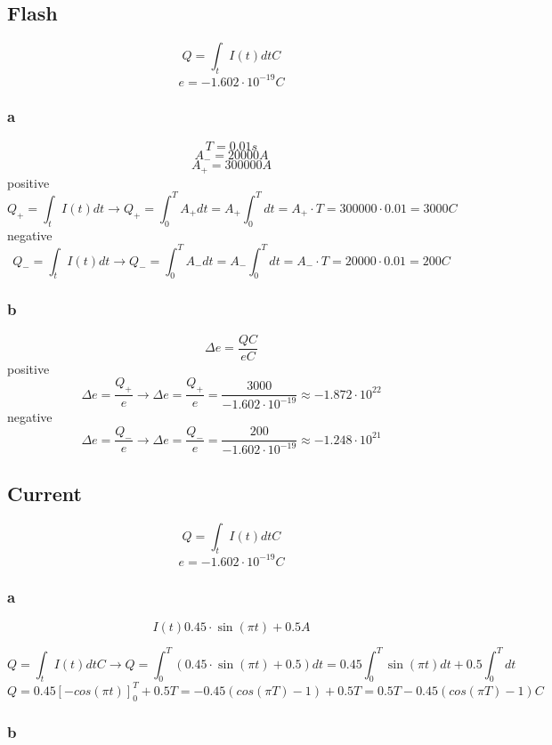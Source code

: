 \subsection{Flash}

\[Q = \int_t I(t) dt \unit{C}\]
\[e = - 1.602 \cdot 10^{-19} \unit{C}\]

\subsubsection{a}

\[T	=   0.01 \unit{s}\]
\[A_-	=  20000 \unit{A}\]
\[A_+	= 300000 \unit{A}\]
positive
\[
	Q_+ = \int_t I(t) dt
	\to Q_+ = \int_0^{T} A_+ dt
	= A_+ \int_0^{T} dt
	= A_+ \cdot T = 300000 \cdot 0.01 = 3000 \unit{C}
\]
negative
\[
	Q_- = \int_t I(t) dt
	\to Q_- = \int_0^{T} A_- dt
	= A_- \int_0^{T} dt
	= A_- \cdot T = 20000 \cdot 0.01 = 200 \unit{C}
\]

\subsubsection{b}
\[\Delta e = \frac{Q \unit{C}}{e \unit{C}}\]
positive
\[
	\Delta e = \frac{Q_+}{e}
	\to \Delta e = \frac{Q_+}{e}
	= \frac{3000}{- 1.602 \cdot 10^{-19}}
	\approx - 1.872 \cdot 10^{22}
\]
negative
\[
	\Delta e = \frac{Q_-}{e}
	\to \Delta e = \frac{Q_-}{e}
	= \frac{200}{- 1.602 \cdot 10^{-19}}
	\approx - 1.248 \cdot 10^{21}
\]

\subsection{Current}

\[Q = \int_t I(t) dt \unit{C}\]
\[e = - 1.602 \cdot 10^{-19} \unit{C}\]

\subsubsection{a}

\[I(t) 0.45 \cdot \sin(\pi t) + 0.5 \unit{A}\]

\[
	Q = \int_t I(t) dt \unit{C}
	\to Q	= \int_0^T (0.45 \cdot \sin(\pi t) + 0.5) dt
	= 0.45 \int_0^T \sin(\pi t) dt + 0.5 \int_0^T dt
\]
\[
	Q = 0.45 [ - cos(\pi t) ]_0^T + 0.5 T
	= - 0.45 ( cos(\pi T) - 1) + 0.5 T
	= 0.5 T - 0.45 ( cos(\pi T) - 1) \unit{C}
\]

\subsubsection{b}

